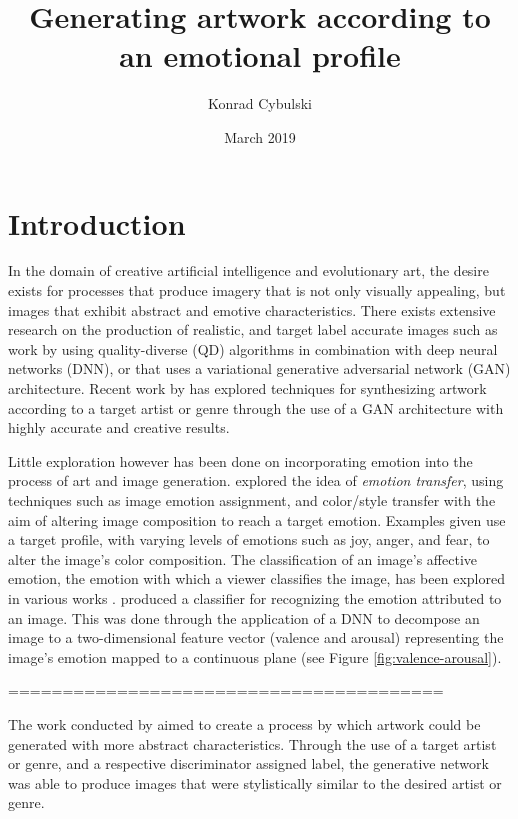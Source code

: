 \documentclass{article}
\title{Generating artwork according to an emotional profile}
\author{Konrad Cybulski}
\date{March 2019}
\begin{document}
	
\maketitle

\section{Introduction}

In the domain of creative artificial intelligence and evolutionary art, the desire exists for processes that produce imagery that is not only visually appealing, but images that exhibit abstract and emotive characteristics.
There exists extensive research on the production of realistic, and target label accurate images such as work by \citet{nguyen2015innovation} using quality-diverse (QD) algorithms in combination with deep neural networks (DNN), or \citet{bao2017cvae} that uses a variational generative adversarial network (GAN) architecture.
Recent work by \citet{tan2017artgan} has explored techniques for synthesizing artwork according to a target artist or genre through the use of a GAN architecture with highly accurate and creative results.

Little exploration however has been done on incorporating emotion into the process of art and image generation.
\citet{ali2017emotional} explored the idea of \textit{emotion transfer}, using techniques such as image emotion assignment, and color/style transfer with the aim of altering image composition to reach a target emotion.
Examples given use a target profile, with varying levels of emotions such as joy, anger, and fear, to alter the image's color composition.
The classification of an image's affective emotion, the emotion with which a viewer classifies the image, has been explored in various works \citep{machajdik2010affective, chen2015learning, kim2018building}.
\citet{kim2018building} produced a classifier for recognizing the emotion attributed to an image.
This was done through the application of a DNN to decompose an image to a two-dimensional feature vector (valence and arousal) representing the image's emotion mapped to a continuous plane (see Figure \ref{fig:valence-arousal}).

========================================

The work conducted by \citet{tan2017artgan} aimed to create a process by which artwork could be generated with more abstract characteristics. 
Through the use of a target artist or genre, and a respective discriminator assigned label, the generative network was able to produce images that were stylistically similar to the desired artist or genre.
\end{document}
